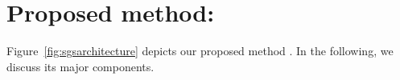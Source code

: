 \section{Proposed method: \sgs}
\label{sec:Method}
Figure~\ref{fig:sgsarchitecture} depicts our proposed method \sgs. In the following, we discuss its major components.
